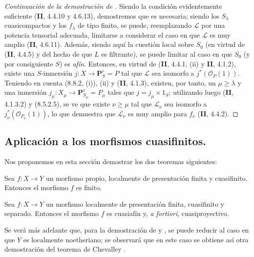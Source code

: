 \begin{proof}[Continuación de la demostración de ]
Siendo la condición evidentemente suficiente (\textbf{II}, 4.4.10 y 4.6.13), demostremos
que es necesaria; siendo los $S_\lambda$ cuasicompactos y los
$f_\lambda$ de tipo finito, se puede, reemplazando $\mathcal L$ por una potencia
tensorial adecuada, limitarse a considerar el caso en que $\mathcal L$ es muy
amplio (\textbf{II}, 4.6.11). Además, siendo aquí la cuestión local sobre $S_0$ (en virtud
de (\textbf{II}, 4.4.5) y del hecho de que $L$ es filtrante), se puede limitar al caso en que
$S_0$ (y por consiguiente $S$) es \emph{afín}. Entonces, en virtud de (\textbf{II}, 4.4.1, (ii) y
\textbf{II}, 4.1.2), existe una $S$-inmersión
$j:X\to\mathbf P_S^r=P$ tal que $\mathcal L$ sea isomorfo a
$j^*(\mathcal O_P(1))$. Teniendo en cuenta (8.8.2, (i)), (ii) y
(\textbf{II}, 4.1.3), existen, por tanto, un $\mu\geq\lambda$ y una inmersión
$j_\mu:X_\mu\to\mathbf P_{S_\mu}^r=P_\mu$ tales que
$j=j_\mu\times1_S$; utilizando luego (\textbf{II}, 4.1.3.2) y (8.5.2.5), se ve
que existe $\nu\geq\mu$ tal que $\mathcal L_\nu$ sea isomorfo a
$j_\nu^*(\mathcal O_{P_\nu}(1))$, lo que demuestra que $\mathcal L_\nu$ es muy
amplio para $f_\nu$ (\textbf{II}, 4.4.2).
\end{proof}

\subsection{Aplicación a los morfismos cuasifinitos.}
\label{subsection:IV.8.11-fr}
\label{IV.8.11-fr}

Nos proponemos en esta sección demostrar los dos teoremas
siguientes:

\begin{theorem}[8.11.1]
Sea $f:X\to Y$ un morfismo propio, localmente de presentación finita y cuasifinito.
Entonces el morfismo $f$ es finito.
\end{theorem}

\begin{theorem}[8.11.2]
\label{IV.8.11.2-fr}
Sea $f:X\to Y$ un morfismo localmente de presentación finita, cuasifinito y separado.
Entonces el morfismo $f$ es cuasiafín y, \emph{a fortiori}, cuasiproyectivo.
\end{theorem}

\begin{remark}[8.11.3]
\label{IV.8.11.3-fr}
Se verá más adelante que, para la demostración de  y , se puede reducir al caso en que $Y$ es localmente noetheriano; se observará que en este caso se obtiene así otra demostración del teorema de Chevalley .
\end{remark}


